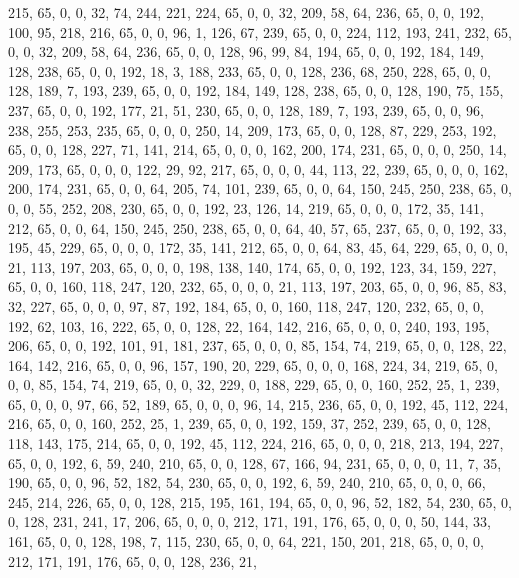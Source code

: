\begin{DoxyCode}
       215, 65, 0, 0, 32, 74, 244, 221, 224, 65, 0, 0, 32, 209, 58, 64, 236, 65, 0, 0, 192, 100, 95, 218, 216, 65, 0,
       0, 96, 1, 126, 67, 239, 65, 0, 0, 224, 112, 193, 241, 232, 65, 0, 0, 32, 209, 58, 64, 236, 65, 0, 0, 128,
       96, 99, 84, 194, 65, 0, 0, 192, 184, 149, 128, 238, 65, 0, 0, 192, 18, 3, 188, 233, 65, 0, 0, 128, 236, 68,
       250, 228, 65, 0, 0, 128, 189, 7, 193, 239, 65, 0, 0, 192, 184, 149, 128, 238, 65, 0, 0, 128, 190, 75, 155,
       237, 65, 0, 0, 192, 177, 21, 51, 230, 65, 0, 0, 128, 189, 7, 193, 239, 65, 0, 0, 96, 238, 255, 253, 235, 65,
       0, 0, 0, 250, 14, 209, 173, 65, 0, 0, 128, 87, 229, 253, 192, 65, 0, 0, 128, 227, 71, 141, 214, 65, 0, 0, 0,
       162, 200, 174, 231, 65, 0, 0, 0, 250, 14, 209, 173, 65, 0, 0, 0, 122, 29, 92, 217, 65, 0, 0, 0, 44, 113, 22,
       239, 65, 0, 0, 0, 162, 200, 174, 231, 65, 0, 0, 64, 205, 74, 101, 239, 65, 0, 0, 64, 150, 245, 250, 238,
       65, 0, 0, 0, 55, 252, 208, 230, 65, 0, 0, 192, 23, 126, 14, 219, 65, 0, 0, 0, 172, 35, 141, 212, 65, 0, 0, 64,
       150, 245, 250, 238, 65, 0, 0, 64, 40, 57, 65, 237, 65, 0, 0, 192, 33, 195, 45, 229, 65, 0, 0, 0, 172, 35,
       141, 212, 65, 0, 0, 64, 83, 45, 64, 229, 65, 0, 0, 0, 21, 113, 197, 203, 65, 0, 0, 0, 198, 138, 140, 174, 65,
       0, 0, 192, 123, 34, 159, 227, 65, 0, 0, 160, 118, 247, 120, 232, 65, 0, 0, 0, 21, 113, 197, 203, 65, 0, 0,
       96, 85, 83, 32, 227, 65, 0, 0, 0, 97, 87, 192, 184, 65, 0, 0, 160, 118, 247, 120, 232, 65, 0, 0, 192, 62,
       103, 16, 222, 65, 0, 0, 128, 22, 164, 142, 216, 65, 0, 0, 0, 240, 193, 195, 206, 65, 0, 0, 192, 101, 91, 181,
       237, 65, 0, 0, 0, 85, 154, 74, 219, 65, 0, 0, 128, 22, 164, 142, 216, 65, 0, 0, 96, 157, 190, 20, 229, 65,
       0, 0, 0, 168, 224, 34, 219, 65, 0, 0, 0, 85, 154, 74, 219, 65, 0, 0, 32, 229, 0, 188, 229, 65, 0, 0, 160,
       252, 25, 1, 239, 65, 0, 0, 0, 97, 66, 52, 189, 65, 0, 0, 0, 96, 14, 215, 236, 65, 0, 0, 192, 45, 112, 224, 216,
       65, 0, 0, 160, 252, 25, 1, 239, 65, 0, 0, 192, 159, 37, 252, 239, 65, 0, 0, 128, 118, 143, 175, 214, 65, 0,
       0, 192, 45, 112, 224, 216, 65, 0, 0, 0, 218, 213, 194, 227, 65, 0, 0, 192, 6, 59, 240, 210, 65, 0, 0, 128,
       67, 166, 94, 231, 65, 0, 0, 0, 11, 7, 35, 190, 65, 0, 0, 96, 52, 182, 54, 230, 65, 0, 0, 192, 6, 59, 240,
       210, 65, 0, 0, 0, 66, 245, 214, 226, 65, 0, 0, 128, 215, 195, 161, 194, 65, 0, 0, 96, 52, 182, 54, 230, 65, 0,
       0, 128, 231, 241, 17, 206, 65, 0, 0, 0, 212, 171, 191, 176, 65, 0, 0, 0, 50, 144, 33, 161, 65, 0, 0, 128,
       198, 7, 115, 230, 65, 0, 0, 64, 221, 150, 201, 218, 65, 0, 0, 0, 212, 171, 191, 176, 65, 0, 0, 128, 236, 21,

\end{DoxyCode}
